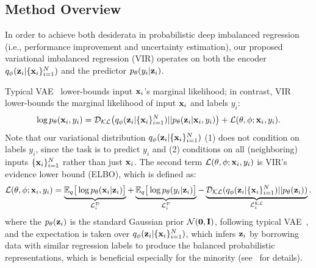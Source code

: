 \subsection{Method Overview}
In order to achieve both desiderata in probabilistic deep imbalanced regression (i.e., performance improvement and uncertainty estimation), our proposed variational imbalanced regression (VIR)  operates on both the encoder $q_{\phi}({\bf z}_i|\{{\bf x}_i\}^{N}_{i=1})$ and the predictor $p_{\theta}(y_i|{\bf z}_i)$.

Typical VAE~\citep{VAE} lower-bounds input ${\bf x}_i$'s marginal likelihood; in contrast, VIR lower-bounds the marginal likelihood of input ${\bf x}_i$ and labels $y_i$: 
%
\begin{align*}
\log p_{\theta}({\bf x}_i, y_i) = 
 \mathcal{D}_{\mathcal{KL}}\big(q_{\phi}({\bf z}_i|\{{\bf x}_i\}^{N}_{i=1})||p_{\theta}({\bf z}_i|{\bf x}_i,y_i)\big) + \mathcal{L}(\theta, \phi; {\bf x}_i, y_i).
\end{align*}
Note that our variational distribution $q_{\phi}({\bf z}_i|\{{\bf x}_i\}^{N}_{i=1})$ (1) does not condition on labels $y_i$, since the task is to predict $y_i$ and (2) conditions on all (neighboring) inputs $\{{\bf x}_i\}^{N}_{i=1}$ rather than just ${\bf x}_i$. 
%
The second term $\mathcal{L}(\theta, \phi; {\bf x}_i, y_i)$ is VIR's evidence lower bound (ELBO), which is defined as: 
%
\begingroup\makeatletter\def\f@size{9}\check@mathfonts
\def\maketag@@@#1{\hbox{\m@th\normalsize\normalfont#1}}%
\begin{align}
\mathcal{L}(\theta, \phi; {\bf x}_i, y_i) =   \underbrace{\mathbb{E}_{q} \big[\log p_{\theta}({\bf x}_i|{\bf z}_i)\big]}_{{\mathcal L}_i^{{\mathcal D}}} +  \underbrace{\mathbb{E}_{q} \big[\log p_{\theta}(y_i|{\bf z}_i) \big]}_{{\mathcal L}_i^{{\mathcal P}}}
 - \underbrace{\mathcal{D}_{\mathcal{KL}}(q_{\phi}({\bf z}_i|\{{\bf x}_i\}^{N}_{i=1})||p_{\theta}({\bf z}_i))}_{{\mathcal L}_i^{{\mathcal K}{\mathcal L}}}. \label{eq:elbo}
\end{align}
\endgroup
%
where {the $p_{\theta}({\bf z}_i)$ is the standard Gaussian prior ${\mathcal N}({\bf 0},{\bf I})$, following typical VAE~\citep{VAE},} and the expectation is taken over $q_{\phi}({\bf z}_i|\{{\bf x}_i\}^{N}_{i=1})$, which infers ${\bf z}_i$ by borrowing data with similar regression labels to produce the balanced probabilistic representations, which is beneficial especially for the minority (see~ for details). 

